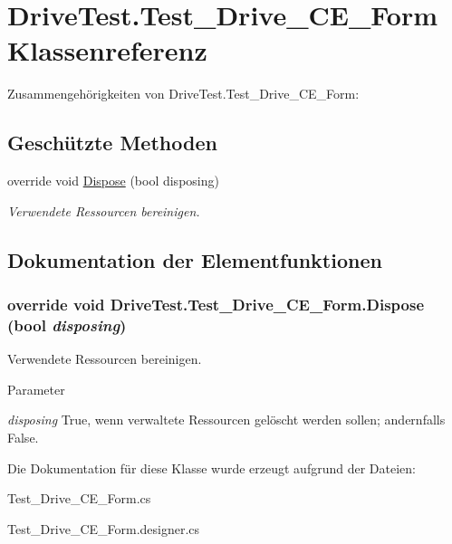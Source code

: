 \hypertarget{class_drive_test_1_1_test___drive___c_e___form}{
\section{DriveTest.Test\_\-Drive\_\-CE\_\-Form Klassenreferenz}
\label{class_drive_test_1_1_test___drive___c_e___form}
}


Zusammengehörigkeiten von DriveTest.Test\_\-Drive\_\-CE\_\-Form:\subsection*{Geschützte Methoden}
\begin{DoxyCompactItemize}
\item 
override void \hyperlink{class_drive_test_1_1_test___drive___c_e___form_a584a1f5c6af489c5e76db7246edc3d7b}{Dispose} (bool disposing)
\begin{DoxyCompactList}\small\item\em Verwendete Ressourcen bereinigen. \item\end{DoxyCompactList}\end{DoxyCompactItemize}


\subsection{Dokumentation der Elementfunktionen}
\hypertarget{class_drive_test_1_1_test___drive___c_e___form_a584a1f5c6af489c5e76db7246edc3d7b}{
\subsubsection[{Dispose}]{\setlength{\rightskip}{0pt plus 5cm}override void DriveTest.Test\_\-Drive\_\-CE\_\-Form.Dispose (bool {\em disposing})}}
\label{class_drive_test_1_1_test___drive___c_e___form_a584a1f5c6af489c5e76db7246edc3d7b}


Verwendete Ressourcen bereinigen. 


\begin{DoxyParams}{Parameter}
\item[{\em disposing}]True, wenn verwaltete Ressourcen gelöscht werden sollen; andernfalls False.\end{DoxyParams}


Die Dokumentation für diese Klasse wurde erzeugt aufgrund der Dateien:\begin{DoxyCompactItemize}
\item 
Test\_\-Drive\_\-CE\_\-Form.cs\item 
Test\_\-Drive\_\-CE\_\-Form.designer.cs\end{DoxyCompactItemize}
